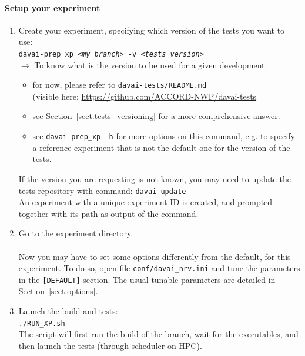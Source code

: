 \documentclass[a4paper,10pt,twoside]{article}
\begin{document}
\paragraph{Setup your experiment}
\begin{enumerate}[label=(\alph*)]
 \item Create your experiment, specifying which version of the tests you want to use:\\
 \texttt{davai-prep\_xp \textit{<my\_branch>} -v \textit{<tests\_version>}}\\
 
 $\rightarrow$ To know what is the version to be used for a given development:
 \begin{itemize}
  \item for now, please refer to \texttt{davai-tests/README.md}\\
        (visible here: \href{https://github.com/ACCORD-NWP/davai-tests}{https://github.com/ACCORD-NWP/davai-tests}
  \item see Section~\ref{sect:tests_versioning} for a more comprehensive answer.
  \item see \texttt{davai-prep\_xp -h} for more options on this command, e.g. to specify a reference experiment that is not the default one for the version of the tests.
 \end{itemize}
 If the version you are requesting is not known, you may need to update the tests repository with command: \texttt{davai-update}\\
 An experiment with a unique experiment ID is created, and prompted together with its path as output of the command.
 \item Go to the experiment directory.\\
 \\
 Now you may have to set some options differently from the default, for this experiment. To do so, open file \texttt{conf/davai\_nrv.ini} and tune the parameters in the \texttt{[DEFAULT]} section. The usual tunable parameters are detailed in Section~\ref{sect:options}.
 \item Launch the build and tests:\\
 \texttt{./RUN\_XP.sh}\\
 The script will first run the build of the branch, wait for the executables, and then launch the tests (through scheduler on HPC).
\end{enumerate}
\end{document}
